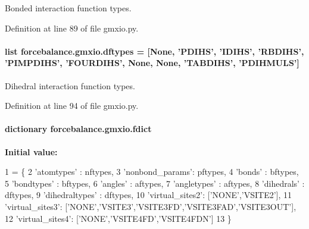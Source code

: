 Bonded interaction function types. 



Definition at line 89 of file gmxio.\-py.

\hypertarget{namespaceforcebalance_1_1gmxio_acd9fed3887161c6386506563fd4f3534}{
\paragraph[{dftypes}]{\setlength{\rightskip}{0pt plus 5cm}list forcebalance.\-gmxio.\-dftypes = \mbox{[}None, 'P\-D\-I\-H\-S', 'I\-D\-I\-H\-S', 'R\-B\-D\-I\-H\-S', 'P\-I\-M\-P\-D\-I\-H\-S', 'F\-O\-U\-R\-D\-I\-H\-S', None, None, 'T\-A\-B\-D\-I\-H\-S', 'P\-D\-I\-H\-M\-U\-L\-S'\mbox{]}}}\label{namespaceforcebalance_1_1gmxio_acd9fed3887161c6386506563fd4f3534}


Dihedral interaction function types. 



Definition at line 94 of file gmxio.\-py.

\hypertarget{namespaceforcebalance_1_1gmxio_a179cbde2e55b4c025af89b225612d6e1}{
\paragraph[{fdict}]{\setlength{\rightskip}{0pt plus 5cm}dictionary forcebalance.\-gmxio.\-fdict}}\label{namespaceforcebalance_1_1gmxio_a179cbde2e55b4c025af89b225612d6e1}
{\bfseries Initial value\-:}
\begin{DoxyCode}
1 = \{
2     \textcolor{stringliteral}{'atomtypes'}     : nftypes,
3     \textcolor{stringliteral}{'nonbond\_params'}: pftypes,
4     \textcolor{stringliteral}{'bonds'}         : bftypes,
5     \textcolor{stringliteral}{'bondtypes'}     : bftypes,
6     \textcolor{stringliteral}{'angles'}        : aftypes,
7     \textcolor{stringliteral}{'angletypes'}    : aftypes,
8     \textcolor{stringliteral}{'dihedrals'}     : dftypes,
9     \textcolor{stringliteral}{'dihedraltypes'} : dftypes,
10     \textcolor{stringliteral}{'virtual\_sites2'}: [\textcolor{stringliteral}{'NONE'},\textcolor{stringliteral}{'VSITE2'}],
11     \textcolor{stringliteral}{'virtual\_sites3'}: [\textcolor{stringliteral}{'NONE'},\textcolor{stringliteral}{'VSITE3'},\textcolor{stringliteral}{'VSITE3FD'},\textcolor{stringliteral}{'VSITE3FAD'},\textcolor{stringliteral}{'VSITE3OUT'}],
12     \textcolor{stringliteral}{'virtual\_sites4'}: [\textcolor{stringliteral}{'NONE'},\textcolor{stringliteral}{'VSITE4FD'},\textcolor{stringliteral}{'VSITE4FDN'}]
13     \}
\end{DoxyCode}



